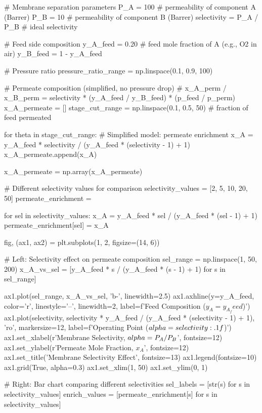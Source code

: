\documentclass[11pt,a4paper]{article}
\begin{document}
\begin{pycode}
# Membrane separation parameters
P_A = 100  # permeability of component A (Barrer)
P_B = 10   # permeability of component B (Barrer)
selectivity = P_A / P_B  # ideal selectivity

# Feed side composition
y_A_feed = 0.20  # feed mole fraction of A (e.g., O2 in air)
y_B_feed = 1 - y_A_feed

# Pressure ratio
pressure_ratio_range = np.linspace(0.1, 0.9, 100)

# Permeate composition (simplified, no pressure drop)
# x_A_perm / x_B_perm = selectivity * (y_A_feed / y_B_feed) * (p_feed / p_perm)
x_A_permeate = []
stage_cut_range = np.linspace(0.1, 0.5, 50)  # fraction of feed permeated

for theta in stage_cut_range:
    # Simplified model: permeate enrichment
    x_A = y_A_feed * selectivity / (y_A_feed * (selectivity - 1) + 1)
    x_A_permeate.append(x_A)

x_A_permeate = np.array(x_A_permeate)

# Different selectivity values for comparison
selectivity_values = [2, 5, 10, 20, 50]
permeate_enrichment = {}

for sel in selectivity_values:
    x_A = y_A_feed * sel / (y_A_feed * (sel - 1) + 1)
    permeate_enrichment[sel] = x_A

fig, (ax1, ax2) = plt.subplots(1, 2, figsize=(14, 6))

# Left: Selectivity effect on permeate composition
sel_range = np.linspace(1, 50, 200)
x_A_vs_sel = [y_A_feed * s / (y_A_feed * (s - 1) + 1) for s in sel_range]

ax1.plot(sel_range, x_A_vs_sel, 'b-', linewidth=2.5)
ax1.axhline(y=y_A_feed, color='r', linestyle='--', linewidth=2,
            label=f'Feed Composition ($y_A = {y_A_feed}$)')
ax1.plot(selectivity, selectivity * y_A_feed / (y_A_feed * (selectivity - 1) + 1),
         'ro', markersize=12, label=f'Operating Point ($\\alpha = {selectivity:.1f}$)')
ax1.set_xlabel(r'Membrane Selectivity, $\\alpha = P_A/P_B$', fontsize=12)
ax1.set_ylabel(r'Permeate Mole Fraction, $x_A$', fontsize=12)
ax1.set_title('Membrane Selectivity Effect', fontsize=13)
ax1.legend(fontsize=10)
ax1.grid(True, alpha=0.3)
ax1.set_xlim(1, 50)
ax1.set_ylim(0, 1)

# Right: Bar chart comparing different selectivities
sel_labels = [str(s) for s in selectivity_values]
enrich_values = [permeate_enrichment[s] for s in selectivity_values]


\end{pycode}
\end{document}
